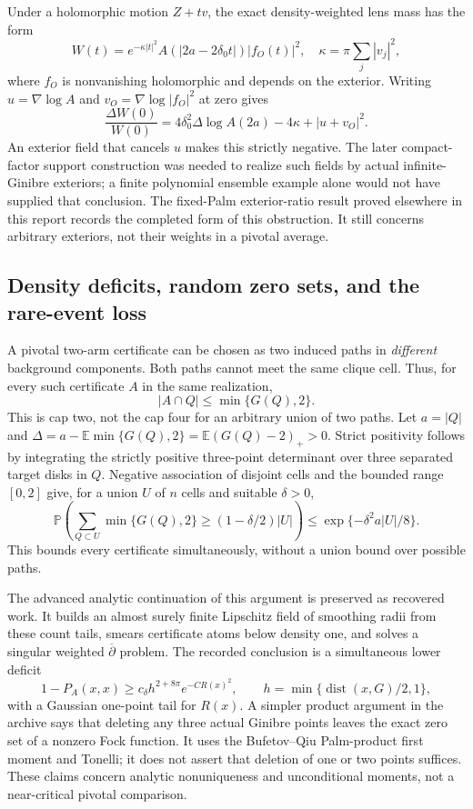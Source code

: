 \documentclass[11pt,a4paper]{article}
\theoremstyle{definition}
\theoremstyle{remark}
\numberwithin{equation}{section}
\begin{document}
Under a holomorphic motion $Z+tv$, the exact density-weighted lens
mass has the form
\[
 W(t)=e^{-\kappa|t|^2}A(|2a-2\delta_0t|)|f_O(t)|^2,
 \quad\kappa=\pi\sum_j|v_j|^2,
\]
where $f_O$ is nonvanishing holomorphic and depends on the exterior.
Writing $u=\nabla\log A$ and $v_O=\nabla\log|f_O|^2$ at zero gives
\[
 \frac{\Delta W(0)}{W(0)}
 =4\delta_0^2\Delta\log A(2a)-4\kappa+|u+v_O|^2.
\]
An exterior field that cancels $u$ makes this strictly negative.
The later compact-factor support construction was needed to realize
such fields by actual infinite-Ginibre exteriors; a finite polynomial
ensemble example alone would not have supplied that conclusion.
The fixed-Palm exterior-ratio result proved elsewhere in this report
records the completed form of this obstruction.  It still concerns
arbitrary exteriors, not their weights in a pivotal average.

\subsection{Density deficits, random zero sets, and the rare-event loss}
\label{br:density}

A pivotal two-arm certificate can be chosen as two induced paths in
\emph{different} background components.  Both paths cannot meet the
same clique cell.  Thus, for every such certificate $A$ in the same
realization,
\begin{equation}
 |A\cap Q|\leq\min\{G(Q),2\}.
 \label{br:cap-two}
\end{equation}
This is cap two, not the cap four for an arbitrary union of two paths.
Let $a=|Q|$ and
$\Delta=a-\mathbb E\min\{G(Q),2\}
=\mathbb E(G(Q)-2)_+>0$.
Strict positivity follows by integrating the strictly positive
three-point determinant over three separated target disks in $Q$.
Negative association of disjoint cells and the bounded range $[0,2]$
give, for a union $U$ of $n$ cells and suitable $\delta>0$,
\[
 \mathbb P\left(\sum_{Q\subset U}\min\{G(Q),2\}
          \geq(1-\delta/2)|U|\right)
 \leq\exp\{-\delta^2a|U|/8\}.
\]
This bounds every certificate simultaneously, without a union bound
over possible paths.

The advanced analytic continuation of this argument is preserved as
recovered work.  It builds an almost surely finite Lipschitz field of
smoothing radii from these count tails, smears certificate atoms below
density one, and solves a singular weighted $\overline\partial$ problem.
The recorded conclusion is a simultaneous lower deficit
\begin{equation}
 1-P_A(x,x)\geq c_\delta h^{2+8\pi}e^{-C R(x)^2},
 \qquad h=\min\{\operatorname{dist}(x,G)/2,1\},
 \label{br:random-deficit}
\end{equation}
with a Gaussian one-point tail for $R(x)$.  A simpler product argument
in the archive says that deleting any three actual Ginibre points
leaves the exact zero set of a nonzero Fock function.  It uses the
Bufetov--Qiu Palm-product first moment and Tonelli; it does not assert
that deletion of one or two points suffices.  These claims concern
analytic nonuniqueness and unconditional moments, not a near-critical
pivotal comparison.
\end{document}
